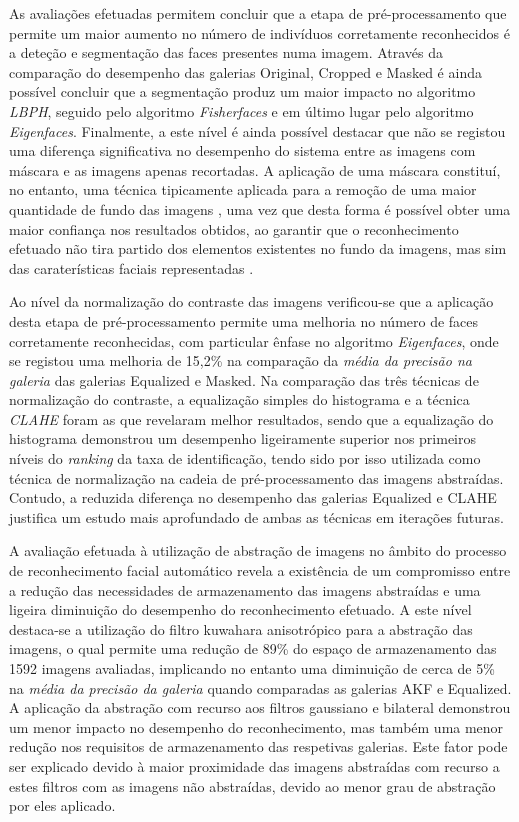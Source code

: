 As avaliações efetuadas permitem concluir que a etapa de pré-processamento que permite um maior aumento no número de indivíduos corretamente reconhecidos é a deteção e segmentação das faces presentes numa imagem. Através da comparação do desempenho das galerias Original, Cropped e Masked é ainda possível concluir que a segmentação produz um maior impacto no algoritmo \textit{LBPH}, seguido pelo algoritmo \textit{Fisherfaces} e em último lugar pelo algoritmo \textit{Eigenfaces}. Finalmente, a este nível é ainda possível destacar que não se registou uma diferença significativa no desempenho do sistema entre as imagens com máscara e as imagens apenas recortadas. A aplicação de uma máscara constituí, no entanto, uma técnica tipicamente aplicada para a remoção de uma maior quantidade de fundo das imagens \cite{Phillips2000, ahonen2004face, Kumar2009}, uma vez que desta forma é possível obter uma maior confiança nos resultados obtidos, ao garantir que o reconhecimento efetuado não tira partido dos elementos existentes no fundo da imagens, mas sim das caraterísticas faciais representadas \cite{Kumar2009}.

Ao nível da normalização do contraste das imagens verificou-se que a aplicação desta etapa de pré-processamento permite uma melhoria no número de faces corretamente reconhecidas, com particular ênfase no algoritmo \textit{Eigenfaces}, onde se registou uma melhoria de 15,2\% na comparação da \textit{média da precisão na galeria} das galerias Equalized e Masked. Na comparação das três técnicas de normalização do contraste, a equalização simples do histograma e a técnica \textit{CLAHE} foram as que revelaram melhor resultados, sendo que a equalização do histograma demonstrou um desempenho ligeiramente superior nos primeiros níveis do \textit{ranking} da taxa de identificação, tendo sido por isso utilizada como técnica de normalização na cadeia de pré-processamento das imagens abstraídas. Contudo, a reduzida diferença no desempenho das galerias Equalized e CLAHE justifica um estudo mais aprofundado de ambas as técnicas em iterações futuras.

A avaliação efetuada à utilização de abstração de imagens no âmbito do processo de reconhecimento facial automático revela a existência de um compromisso entre a redução das necessidades de armazenamento das imagens abstraídas e uma ligeira diminuição do desempenho do reconhecimento efetuado. A este nível destaca-se a utilização do filtro kuwahara anisotrópico para a abstração das imagens, o qual permite uma redução de 89\% do espaço de armazenamento das 1592 imagens avaliadas, implicando no entanto uma diminuição de cerca de 5\% na \textit{média da precisão da galeria} quando comparadas as galerias AKF e Equalized. A aplicação da abstração com recurso aos filtros gaussiano e bilateral demonstrou um menor impacto no desempenho do reconhecimento, mas também uma menor redução nos requisitos de armazenamento das respetivas galerias. Este fator pode ser explicado devido à maior proximidade das imagens abstraídas com recurso a estes filtros com as imagens não abstraídas, devido ao menor grau de abstração por eles aplicado.

